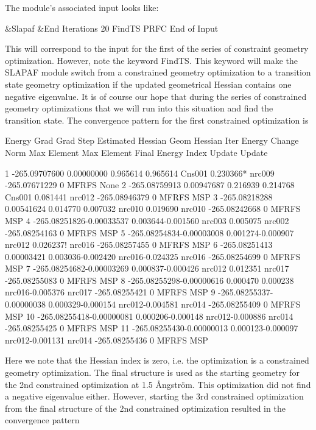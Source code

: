 The  module's associated input looks like:

\begin{inputlisting}
&Slapaf &End
Iterations
20
FindTS
PRFC
End of Input
\end{inputlisting}

This will correspond to the input for the first of the series of constraint 
geometry optimization. However, note the keyword FindTS. This
keyword will make the SLAPAF module switch from a constrained geometry optimization 
to a transition state geometry optimization if the updated geometrical
Hessian contains one negative eigenvalue. It is of course our hope that during the 
series of constrained geometry optimizations that we will run into
this situation and find the transition state. The convergence pattern for the first 
constrained optimization is

\begin{sourcelisting}
                      Energy     Grad     Grad          Step           Estimated  Hessian Geom Hessian
Iter     Energy       Change     Norm      Max  Element  Max  Element  Final Energy Index Update Update

 1   -265.09707600 0.00000000 0.965614 0.965614 Cns001 0.230366* nrc009 -265.07671229  0  MFRFS   None
 2   -265.08759913 0.00947687 0.216939 0.214768 Cns001 0.081441  nrc012 -265.08946379  0  MFRFS   MSP
 3   -265.08218288 0.00541624 0.014770 0.007032 nrc010 0.019690  nrc010 -265.08242668  0  MFRFS   MSP
 4   -265.08251826-0.00033537 0.003644-0.001560 nrc003 0.005075  nrc002 -265.08254163  0  MFRFS   MSP
 5   -265.08254834-0.00003008 0.001274-0.000907 nrc012 0.026237! nrc016 -265.08257455  0  MFRFS   MSP
 6   -265.08251413 0.00003421 0.003036-0.002420 nrc016-0.024325  nrc016 -265.08254699  0  MFRFS   MSP
 7   -265.08254682-0.00003269 0.000837-0.000426 nrc012 0.012351  nrc017 -265.08255083  0  MFRFS   MSP
 8   -265.08255298-0.00000616 0.000470 0.000238 nrc016-0.005376  nrc017 -265.08255421  0  MFRFS   MSP
 9   -265.08255337-0.00000038 0.000329-0.000154 nrc012-0.004581  nrc014 -265.08255409  0  MFRFS   MSP
10   -265.08255418-0.00000081 0.000206-0.000148 nrc012-0.000886  nrc014 -265.08255425  0  MFRFS   MSP
11   -265.08255430-0.00000013 0.000123-0.000097 nrc012-0.001131  nrc014 -265.08255436  0  MFRFS   MSP
\end{sourcelisting}

Here we note that the Hessian index is zero, i.e. the optimization is a constrained 
geometry optimization. The final structure is used as the starting geometry for 
the 2nd constrained optimization at 1.5 {\AA}ngstr\"{o}m. This optimization did not find a negative
eigenvalue either. However, starting the 3rd constrained optimization from the final 
structure of the 2nd constrained optimization resulted in the convergence pattern


